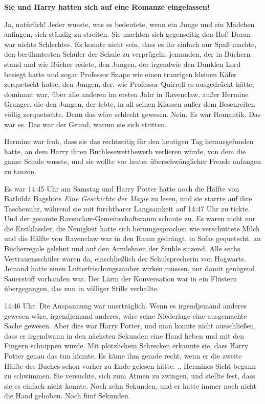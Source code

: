 \textbf{ Sie und Harry hatten sich auf eine Romanze eingelassen! }

Ja, natürlich! Jeder wusste, was es bedeutete, wenn ein Junge und ein Mädchen
anfingen, sich ständig zu streiten. Sie machten sich gegenseitig den Hof! Daran
war nichts Schlechtes. Es konnte nicht sein, dass es ihr einfach nur Spaß
machte, den berühmtesten Schüler der Schule zu verprügeln, jemanden, der in
Büchern stand und wie Bücher redete, den Jungen, der irgendwie den Dunklen Lord
besiegt hatte und sogar Professor Snape wie einen traurigen kleinen Käfer
zerquetscht hatte, den Jungen, der, wie Professor Quirrell es ausgedrückt hätte,
dominant war, über alle anderen im ersten Jahr in Ravenclaw, außer Hermine
Granger, die den Jungen, der lebte, in all seinen Klassen außer dem Besenreiten
völlig zerquetschte. Denn das wäre schlecht gewesen. Nein. Es war Romantik. Das
war es. Das war der Grund, warum sie sich stritten.

Hermine war froh, dass sie das rechtzeitig für den heutigen Tag herausgefunden
hatte, an dem Harry ihren Buchlesewettbewerb verlieren würde, von dem die ganze
Schule wusste, und sie wollte vor lauter überschwänglicher Freude anfangen zu
tanzen.

Es war 14:45 Uhr am Samstag und Harry Potter hatte noch die Hälfte von Bathilda
Bagshots \emph{Eine Geschichte der Magie} zu lesen, und sie starrte auf ihre
Taschenuhr, während sie mit furchtbarer Langsamkeit auf 14:47 Uhr zu tickte. Und
der gesamte Ravenclaw-Gemeinschaftsraum schaute zu. Es waren nicht nur die
Erstklässler, die Neuigkeit hatte sich herumgesprochen wie verschüttete Milch
und die Hälfte von Ravenclaw war in den Raum gedrängt, in Sofas gequetscht, an
Bücherregale gelehnt und auf den Armlehnen der Stühle sitzend. Alle sechs
Vertrauensschüler waren da, einschließlich der Schulsprecherin von Hogwarts.
Jemand hatte einen Lufterfrischungszauber wirken müssen, nur damit genügend
Sauerstoff vorhanden war. Der Lärm der Konversation war in ein Flüstern
übergegangen, das nun in völliger Stille verhallte.

14:46 Uhr. Die Anspannung war unerträglich. Wenn es irgendjemand anderes gewesen
wäre, irgendjemand anderes, wäre seine Niederlage eine ausgemachte Sache
gewesen. Aber dies war Harry Potter, und man konnte nicht ausschließen, dass er
irgendwann in den nächsten Sekunden eine Hand heben und mit den Fingern
schnippen würde. Mit plötzlichem Schrecken erkannte sie, dass Harry Potter genau
das tun könnte. Es käme ihm gerade recht, wenn er die zweite Hälfte des Buches
schon vorher zu Ende gelesen hätte. .. Hermines Sicht begann zu schwimmen. Sie
versuchte, sich zum Atmen zu zwingen, und stellte fest, dass sie es einfach
nicht konnte. Noch zehn Sekunden, und er hatte immer noch nicht die Hand
gehoben. Noch fünf Sekunden.

